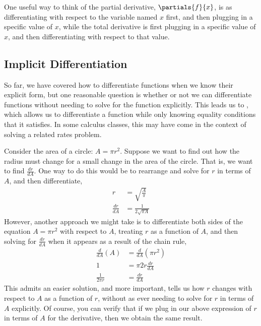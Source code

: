 One useful way to think of the partial derivative, $\partials{f}{x}$, is as differentiating with respect to the variable named $x$ first, and then plugging in a specific value of $x$, while the total derivative is first plugging in a specific value of $x$, and then differentiating with respect to that value. 

\subsection*{Implicit Differentiation}
So far, we have covered how to differentiate functions when we know their explicit form, but one reasonable question is whether or not we can differentiate functions without needing to solve for the function explicitly. This leads us to , which allows us to differentiate a function while only knowing equality conditions that it satisfies. In some calculus classes, this may have come in the context of solving a related rates problem. 

Consider the area of a circle: $A = \pi r^2$. Suppose we want to find out how the radius must change for a small change in the area of the circle. That is, we want to find $\frac{dr}{dA}$. One way to do this would be to rearrange and solve for $r$ in terms of $A$, and then differentiate,
\begin{align*}
    r &= \sqrt{\frac{A}{\pi}} \\
    \frac{dr}{dA} &= \frac{1}{2\sqrt{\pi A}}
\end{align*}
However, another approach we might take is to differentiate both sides of the equation $A = \pi r^2$ with respect to $A$, treating $r$ as a function of $A$, and then solving for $\frac{dr}{dA}$ when it appears as a result of the chain rule,
\begin{align*}
    \frac{d}{dA} (A) &= \frac{d}{dA} (\pi r^2) \\
    1 &= \pi 2r \frac{dr}{dA} \\
    \frac{1}{2\pi r} &= \frac{dr}{dA}
\end{align*}
This admits an easier solution, and more important, tells us how $r$ changes with respect to $A$ as a function of $r$, without as ever needing to solve for $r$ in terms of $A$ explicitly. Of course, you can verify that if we plug in our above expression of $r$ in terms of $A$ for the derivative, then we obtain the same result. 

